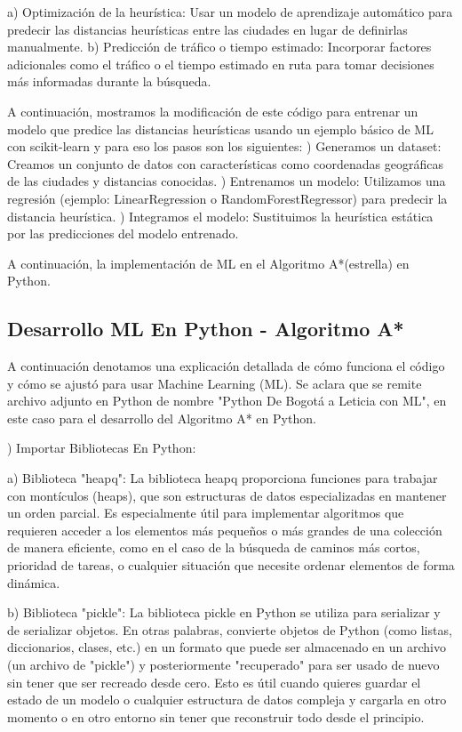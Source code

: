 \documentclass[conference]{IEEEtran}
\begin{document}
\begin{itemize}
	\subitem a) Optimización de la heurística: Usar un modelo de aprendizaje automático para predecir las distancias heurísticas entre las ciudades en lugar de definirlas manualmente.
	\subitem b) Predicción de tráfico o tiempo estimado: Incorporar factores adicionales como el tráfico o el tiempo estimado en ruta para tomar decisiones más informadas durante la búsqueda.
	
	A continuación, mostramos la modificación de este código para entrenar un modelo que predice las distancias heurísticas usando un ejemplo básico de ML con scikit-learn y para eso los pasos son los siguientes:
	) Generamos un dataset: Creamos un conjunto de datos con características como coordenadas geográficas de las ciudades y distancias conocidas.
	) Entrenamos un modelo: Utilizamos una regresión (ejemplo: LinearRegression o RandomForestRegressor) para predecir la distancia heurística.
	) Integramos el modelo: Sustituimos la heurística estática por las predicciones del modelo entrenado.
	
	A continuación, la implementación de ML en el Algoritmo A*(estrella) en Python.
	
	\subsection{Desarrollo ML En Python - Algoritmo A*}
	
	A continuación denotamos una explicación detallada de cómo funciona el código y cómo se ajustó para usar Machine Learning (ML). Se aclara que se remite archivo adjunto en Python de nombre "Python De Bogotá a Leticia con ML", en este caso para el desarrollo del Algoritmo A* en Python.
	
	) Importar Bibliotecas En Python:
	
	a) Biblioteca "heapq": La biblioteca heapq proporciona funciones para trabajar con montículos (heaps), que son estructuras de datos especializadas en mantener un orden parcial. Es especialmente útil para implementar algoritmos que requieren acceder a los elementos más pequeños o más grandes de una colección de manera eficiente, como en el caso de la búsqueda de caminos más cortos, prioridad de tareas, o cualquier situación que necesite ordenar elementos de forma dinámica.
	
	b) Biblioteca "pickle": La biblioteca pickle en Python se utiliza para serializar y de serializar objetos. En otras palabras, convierte objetos de Python (como listas, diccionarios, clases, etc.) en un formato que puede ser almacenado en un archivo (un archivo de "pickle") y posteriormente "recuperado" para ser usado de nuevo sin tener que ser recreado desde cero. Esto es útil cuando quieres guardar el estado de un modelo o cualquier estructura de datos compleja y cargarla en otro momento o en otro entorno sin tener que reconstruir todo desde el principio.
	

\end{itemize}
\end{document}
